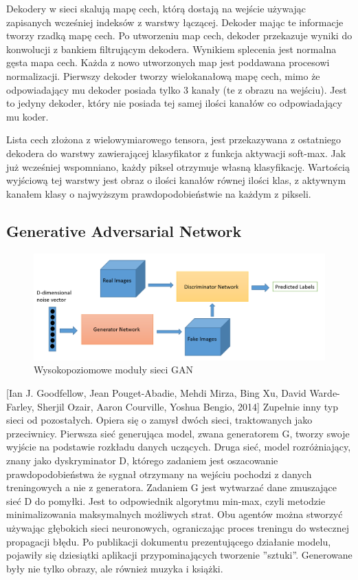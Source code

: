 \documentclass[12pt,a4paper,twoside,titlepage,openright]{book}
\begin{document}
Dekodery w sieci skalują mapę cech, którą dostają na wejście używając zapisanych wcześniej indeksów z warstwy łączącej. Dekoder mając te informacje tworzy rzadką mapę cech. Po utworzeniu map cech, dekoder przekazuje wyniki do konwolucji z bankiem filtrującym dekodera. Wynikiem splecenia jest normalna gęsta mapa cech. Każda z nowo utworzonych map jest poddawana procesowi normalizacji. Pierwszy dekoder tworzy wielokanałową mapę cech, mimo że odpowiadający mu dekoder posiada tylko 3 kanały (te z obrazu na wejściu). Jest to jedyny dekoder, który nie posiada tej samej ilości kanałów co odpowiadający mu koder.

Lista cech złożona z wielowymiarowego tensora, jest przekazywana z ostatniego dekodera do warstwy zawierającej klasyfikator z funkcja aktywacji soft-max. Jak już wcześniej wspomniano, każdy piksel otrzymuje własną klasyfikację. Wartością wyjściową tej warstwy jest obraz o ilości kanałów równej ilości klas, z aktywnym kanałem klasy o najwyższym prawdopodobieństwie na każdym z pikseli.

\cite{DBLP:journals/corr/BadrinarayananH15}

\subsection{Generative Adversarial Network}
\begin{figure}[ht]
	\centering
			\includegraphics[resolution=100,scale=0.36]{GAN.png}
		\caption{Wysokopoziomowe moduły sieci GAN}
\end{figure}

[Ian J. Goodfellow, Jean Pouget-Abadie, Mehdi Mirza, Bing Xu, David Warde-Farley, Sherjil Ozair, Aaron Courville, Yoshua Bengio, 2014] Zupełnie inny typ sieci od pozostałych. Opiera się o zamysł dwóch sieci, traktowanych jako przeciwnicy. Pierwsza sieć generująca model, zwana generatorem G, tworzy swoje wyjście na podstawie rozkładu danych uczących. Druga sieć, model rozróżniający, znany jako dyskryminator D, którego zadaniem jest oszacowanie prawdopodobieństwa że sygnał otrzymany na wejściu pochodzi z danych treningowych a nie z generatora. Zadaniem G jest wytwarzać dane zmuszające sieć D do pomyłki. Jest to odpowiednik algorytmu min-max, czyli metodzie minimalizowania maksymalnych możliwych strat. Obu agentów można stworzyć używając głębokich sieci neuronowych, ograniczając proces treningu do wstecznej propagacji błędu. Po publikacji dokumentu prezentującego działanie modelu, pojawiły się dziesiątki aplikacji przypominających tworzenie ''sztuki''. Generowane były nie tylko obrazy, ale również muzyka i książki. 
\end{document}
